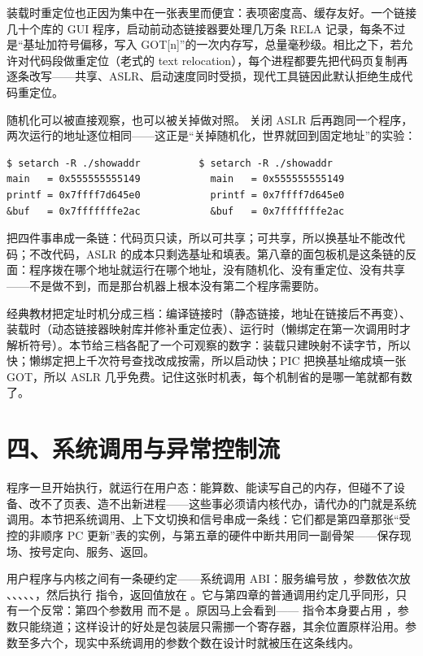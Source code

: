 装载时重定位也正因为集中在一张表里而便宜：表项密度高、缓存友好。一个链接几十个库的 GUI 程序，启动前动态链接器要处理几万条 RELA 记录，每条不过是“基址加符号偏移，写入 GOT[n]”的一次内存写，总量毫秒级。相比之下，若允许对代码段做重定位（老式的 text relocation），每个进程都要先把代码页复制再逐条改写——共享、ASLR、启动速度同时受损，现代工具链因此默认拒绝生成代码重定位。

随机化可以被直接观察，也可以被关掉做对照。 关闭 ASLR 后再跑同一个程序，两次运行的地址逐位相同——这正是“关掉随机化，世界就回到固定地址”的实验：

\begin{lstlisting}
$ setarch -R ./showaddr          $ setarch -R ./showaddr
main   = 0x555555555149            main   = 0x555555555149
printf = 0x7ffff7d645e0            printf = 0x7ffff7d645e0
&buf   = 0x7fffffffe2ac            &buf   = 0x7fffffffe2ac
\end{lstlisting}

把四件事串成一条链：代码页只读，所以可共享；可共享，所以换基址不能改代码；不改代码，ASLR 的成本只剩选基址和填表。第八章的面包板机是这条链的反面：程序拨在哪个地址就运行在哪个地址，没有随机化、没有重定位、没有共享——不是做不到，而是那台机器上根本没有第二个程序需要防。

\begin{classicnote}
经典教材把定址时机分成三档：编译链接时（静态链接，地址在链接后不再变）、装载时（动态链接器映射库并修补重定位表）、运行时（懒绑定在第一次调用时才解析符号）。本节给三档各配了一个可观察的数字：装载只建映射不读字节，所以  快；懒绑定把上千次符号查找改成按需，所以启动快；PIC 把换基址缩成填一张 GOT，所以 ASLR 几乎免费。记住这张时机表，每个机制省的是哪一笔就都有数了。
\end{classicnote}

\section{四、系统调用与异常控制流}

程序一旦开始执行，就运行在用户态：能算数、能读写自己的内存，但碰不了设备、改不了页表、造不出新进程——这些事必须请内核代办，请代办的门就是系统调用。本节把系统调用、上下文切换和信号串成一条线：它们都是第四章那张“受控的非顺序 PC 更新”表的实例，与第五章的硬件中断共用同一副骨架——保存现场、按号定向、服务、返回。

用户程序与内核之间有一条硬约定——系统调用 ABI：服务编号放 ，参数依次放 、、、、、，然后执行  指令，返回值放在 。它与第四章的普通调用约定几乎同形，只有一个反常：第四个参数用  而不是 。原因马上会看到—— 指令本身要占用 ，参数只能绕道；这样设计的好处是包装层只需挪一个寄存器，其余位置原样沿用。参数至多六个，现实中系统调用的参数个数在设计时就被压在这条线内。

